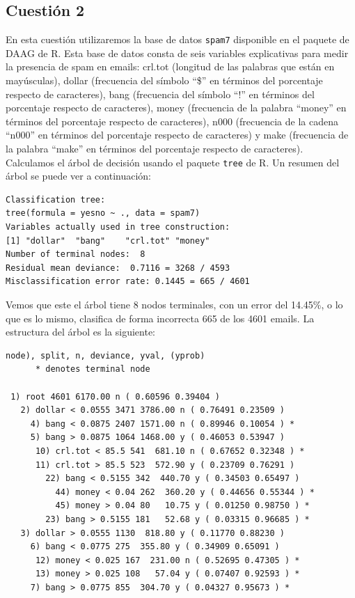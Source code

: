 \documentclass[12pt,a4paper,twoside,openright,titlepage,final]{article}
\begin{document}
\subsection{Cuestión 2}

En esta cuestión utilizaremos la base de datos \texttt{spam7} disponible en el paquete de DAAG de R. Esta base de datos consta de seis variables explicativas para medir la presencia de spam en emails: crl.tot (longitud de las palabras que están en mayúsculas), dollar (frecuencia del símbolo ``\$'' en términos del porcentaje respecto de caracteres), bang (frecuencia del símbolo ``!'' en términos del porcentaje respecto de caracteres), money (frecuencia de la palabra ``money'' en términos del porcentaje respecto de caracteres), n000 (frecuencia de la cadena ``n000'' en términos del porcentaje respecto de caracteres) y make (frecuencia de la palabra ``make'' en términos del porcentaje respecto de caracteres).\\

Calculamos el árbol de decisión usando el paquete \texttt{tree} de R. Un resumen del árbol se puede ver a continuación:

\begin{verbatim}
Classification tree:
tree(formula = yesno ~ ., data = spam7)
Variables actually used in tree construction:
[1] "dollar"  "bang"    "crl.tot" "money"  
Number of terminal nodes:  8 
Residual mean deviance:  0.7116 = 3268 / 4593 
Misclassification error rate: 0.1445 = 665 / 4601 
\end{verbatim}

Vemos que este el árbol tiene 8 nodos terminales, con un error del 14.45\%, o lo que es lo mismo, clasifica de forma incorrecta 665 de los 4601 emails. La estructura del árbol es la siguiente:

\begin{verbatim}
node), split, n, deviance, yval, (yprob)
      * denotes terminal node

 1) root 4601 6170.00 n ( 0.60596 0.39404 )  
   2) dollar < 0.0555 3471 3786.00 n ( 0.76491 0.23509 )  
     4) bang < 0.0875 2407 1571.00 n ( 0.89946 0.10054 ) *
     5) bang > 0.0875 1064 1468.00 y ( 0.46053 0.53947 )  
      10) crl.tot < 85.5 541  681.10 n ( 0.67652 0.32348 ) *
      11) crl.tot > 85.5 523  572.90 y ( 0.23709 0.76291 )  
        22) bang < 0.5155 342  440.70 y ( 0.34503 0.65497 )  
          44) money < 0.04 262  360.20 y ( 0.44656 0.55344 ) *
          45) money > 0.04 80   10.75 y ( 0.01250 0.98750 ) *
        23) bang > 0.5155 181   52.68 y ( 0.03315 0.96685 ) *
   3) dollar > 0.0555 1130  818.80 y ( 0.11770 0.88230 )  
     6) bang < 0.0775 275  355.80 y ( 0.34909 0.65091 )  
      12) money < 0.025 167  231.00 n ( 0.52695 0.47305 ) *
      13) money > 0.025 108   57.04 y ( 0.07407 0.92593 ) *
     7) bang > 0.0775 855  304.70 y ( 0.04327 0.95673 ) *
\end{verbatim}
\end{document}

